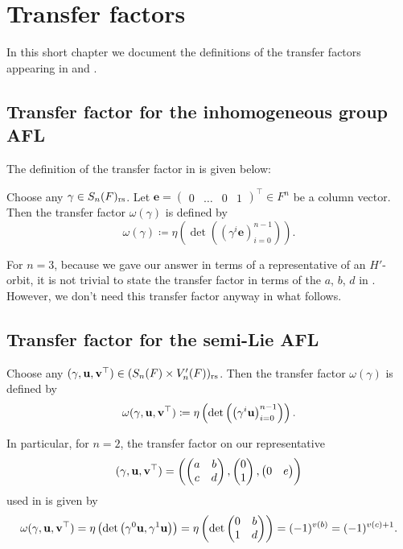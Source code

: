 \chapter{Transfer factors}
\label{ch:transf}

In this short chapter we document the definitions of the transfer
factors appearing in  and .

\section{Transfer factor for the inhomogeneous group AFL}
The definition of the transfer factor in  is given below:
\begin{definition}
  Choose any $\gamma \in S_n(F)_{\mathrm{rs}}$.
  Let $\mathbf{e} = \begin{pmatrix} 0 & \dots & 0 & 1 \end{pmatrix}^\top \in F^n$
  be a column vector.
  Then the transfer factor $\omega(\gamma)$ is defined by
  \[ \omega(\gamma) \coloneqq
    \eta\left( \det\left( \left( \gamma^i \mathbf{e} \right)_{i=0}^{n-1} \right) \right).
  \]
\end{definition}

For $n=3$, because we gave our answer in terms of a representative
of an $H'$-orbit, it is not trivial to state the transfer factor
in terms of the $a$, $b$, $d$ in .
However, we don't need this transfer factor anyway in what follows.

\section{Transfer factor for the semi-Lie AFL}
\begin{definition}
  Choose any ${(\gamma, \mathbf u, \mathbf v^\top)} \in (S_n(F) \times V_n'(F))_{\mathrm{rs}}$.
  Then the transfer factor $\omega(\gamma)$ is defined by
  \[ \omega{(\gamma, \mathbf u, \mathbf v^\top)} \coloneqq
    \eta\left( \det\left( \left( \gamma^i \mathbf u \right)_{i=0}^{n-1} \right) \right).
  \]
\end{definition}

In particular, for $n = 2$, the transfer factor on our representative
\[ {(\gamma, \mathbf u, \mathbf v^\top)} = \left( \begin{pmatrix} a & b \\ c & d \end{pmatrix},
  \begin{pmatrix} 0 \\ 1 \end{pmatrix}, \begin{pmatrix} 0 & e \end{pmatrix} \right) \]
used in  is given by
\begin{equation}
    \omega{(\gamma, \mathbf u, \mathbf v^\top)}
    = \eta\left( \det
      \left( \gamma^0 \mathbf u, \gamma^1 \mathbf u \right)
    \right)
    = \eta\left( \det
      \begin{pmatrix} 0 & b \\ 1 & d \end{pmatrix}
    \right)
    = (-1)^{v(b)} = (-1)^{v(c)+1}.
  \label{eq:semi_lie_transfer}
\end{equation}
